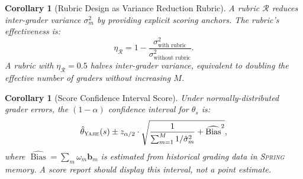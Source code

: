 \documentclass[11pt,a4paper]{article}
\newtheorem{corollary}[theorem]{Corollary}
\theoremstyle{definition}
\theoremstyle{remark}
\newcommand{\Yajie}{\textsc{Yajie}}
\newcommand{\Spring}{\textsc{Spring}}
\DeclareMathOperator{\Bias}{Bias}
\newcommand{\cR}{\mathcal{R}}
\newcommand{\rubric}{\cR}
\newcommand{\trueScore}{\theta}
\newcommand{\biasVec}{\mathbf{b}}
\begin{document}
\begin{corollary}[Rubric Design as Variance Reduction Rubric]
\label{cor:rubric_variance}
A rubric $\rubric$ reduces inter-grader variance $\sigma_m^2$ by providing explicit scoring anchors. The rubric's effectiveness is:
\begin{equation}
    \eta_{\rubric} = 1 - \frac{\sigma^2_{\text{with rubric}}}{\sigma^2_{\text{without rubric}}}.
\end{equation}
A rubric with $\eta_{\rubric} = 0.5$ halves inter-grader variance, equivalent to doubling the effective number of graders without increasing $M$.
\end{corollary}
\begin{corollary}[Score Confidence Interval Score]
\label{cor:score_ci}
Under normally-distributed grader errors, the $(1-\alpha)$ confidence interval for $\trueScore_s$ is:
\begin{equation}
    \hat{\theta}_{\Yajie}(s) \pm z_{\alpha/2} \cdot \sqrt{\frac{1}{\sum_{m=1}^M 1/\hat{\sigma}_m^2} + \widehat{\Bias}^2},
\end{equation}
where $\widehat{\Bias} = \sum_m \omega_m \biasVec_m$ is estimated from historical grading data in \Spring{} memory. A score report should display this interval, not a point estimate.
\end{corollary}
\end{document}
